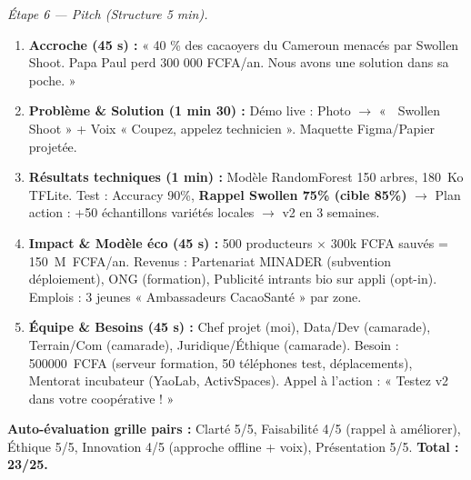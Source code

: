 \documentclass[11pt]{article}
\begin{document}
\begin{exoresolu}
\emph{Étape 6 — Pitch (Structure 5 min).}
\begin{enumerate}
    \item \textbf{Accroche (45 s) :} « 40 \% des cacaoyers du Cameroun menacés par Swollen Shoot. Papa Paul perd 300 000 FCFA/an. Nous avons une solution dans sa poche. »
    \item \textbf{Problème \& Solution (1 min 30) :} Démo live : Photo $\rightarrow$ « 🚨 Swollen Shoot » + Voix « Coupez, appelez technicien ». Maquette Figma/Papier projetée.
    \item \textbf{Résultats techniques (1 min) :} Modèle RandomForest 150 arbres, \SI{180}{Ko} TFLite. Test : Accuracy 90\%, \textbf{Rappel Swollen 75\% (cible 85\%)} $\rightarrow$ Plan action : +50 échantillons variétés locales $\rightarrow$ v2 en 3 semaines.
    \item \textbf{Impact \& Modèle éco (45 s) :} 500 producteurs $\times$ 300k FCFA sauvés = \SI{150}{M FCFA/an}. Revenus : Partenariat MINADER (subvention déploiement), ONG (formation), Publicité intrants bio sur appli (opt-in). Emplois : 3 jeunes « Ambassadeurs CacaoSanté » par zone.
    \item \textbf{Équipe \& Besoins (45 s) :} Chef projet (moi), Data/Dev (camarade), Terrain/Com (camarade), Juridique/Éthique (camarade). Besoin : \SI{500 000}{FCFA} (serveur formation, 50 téléphones test, déplacements), Mentorat incubateur (YaoLab, ActivSpaces). Appel à l'action : « Testez v2 dans votre coopérative ! »
\end{enumerate}
\textbf{Auto-évaluation grille pairs :} Clarté 5/5, Faisabilité 4/5 (rappel à améliorer), Éthique 5/5, Innovation 4/5 (approche offline + voix), Présentation 5/5. \textbf{Total : 23/25.}
\end{exoresolu}
\end{document}
